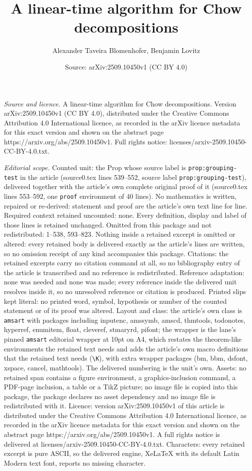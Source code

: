 \documentclass[10pt,a4paper]{amsart}
\title[A linear-time algorithm for Chow decompositions]{A linear-time algorithm for Chow decompositions}
\author{Alexander Taveira Blomenhofer, Benjamin Lovitz}
\date{Source: arXiv:2509.10450v1 (CC BY 4.0)}
\begin{document}
\maketitle

\noindent\emph{Source and licence.} A linear-time algorithm for Chow decompositions. Version arXiv:2509.10450v1 (CC BY 4.0), distributed under the Creative Commons Attribution 4.0 International licence, as recorded in the arXiv licence metadata for this exact version and shown on the abstract page https://arxiv.org/abs/2509.10450v1. Full rights notice: licenses/arxiv-2509.10450-CC-BY-4.0.txt.\par\smallskip

\noindent\textit{Editorial scope.} Counted unit: the Prop whose source label is \texttt{prop:grouping-test} in the article (source0.tex lines 539--552, source label \texttt{prop:grouping-test}), delivered together with the article's own complete original proof of it (source0.tex lines 553--592, one \texttt{proof} environment of 40 lines). No mathematics is written, repaired or re-derived: statement and proof are the article's own text line for line. Required context retained uncounted: none. Every definition, display and label of those lines is retained unchanged. Omitted from this package and not redistributed: 1--538, 593--823. Nothing inside a retained excerpt is omitted or altered: every retained body is delivered exactly as the article's lines are written, so no omission receipt of any kind accompanies this package. Citations: the retained excerpts carry no citation command at all, so no bibliography entry of the article is transcribed and no reference is redistributed. Reference adaptation: none was needed and none was made; every reference inside the delivered unit resolves inside it, so no unresolved reference or citation is produced. Printed slips kept literal: no printed word, symbol, hypothesis or number of the counted statement or of its proof was altered. Layout and class: the article's own class is \texttt{amsart} with packages including inputenc, amssymb, amscd, thmtools, todonotes, hyperref, enumitem, float, cleveref, stmaryrd, pifont; the wrapper is the lane's pinned \texttt{amsart} editorial wrapper at 10pt on A4, which restates the theorem-like environments the retained text needs and adds the article's own macro definitions that the retained text needs (\texttt{\textbackslash K}), with extra wrapper packages (bm, bbm, dsfont, xspace, cancel, mathtools). The delivered numbering is the unit's own. Assets: no retained span contains a figure environment, a graphics-inclusion command, a PDF-page inclusion, a table or a TikZ picture; no image file is copied into this package, the package declares no asset dependency and no image file is redistributed with it. Licence: version arXiv:2509.10450v1 of this article is distributed under the Creative Commons Attribution 4.0 International licence, as recorded in the arXiv licence metadata for this exact version and shown on the abstract page https://arxiv.org/abs/2509.10450v1. A full rights notice is delivered at licenses/arxiv-2509.10450-CC-BY-4.0.txt. Characters: every retained excerpt is pure ASCII, so the delivered engine, XeLaTeX with its default Latin Modern text font, reports no missing character.
\end{document}
